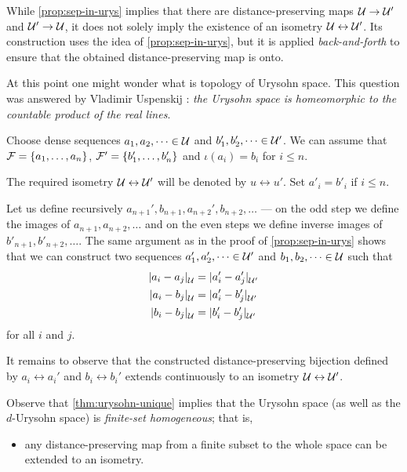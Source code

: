 While \ref{prop:sep-in-urys} implies that there are distance-preserving maps $\mathcal{U}\to \mathcal{U}'$ and $\mathcal{U}'\to \mathcal{U}$,
it does not solely imply the existence of an isometry $\mathcal{U}\leftrightarrow \mathcal{U}'$.
Its construction uses the idea of \ref{prop:sep-in-urys}, but it is applied {}\emph{back-and-forth} to ensure that the obtained distance-preserving map is onto.

At this point one might wonder what is topology of Urysohn space.
This question was answered by Vladimir Uspenskij \cite{uspenskij}: \textit{the Urysohn space is homeomorphic to the countable product of the real lines}.

Choose dense sequences $a_1,a_2,\dots\in \mathcal{U}$ and $b'_1,b'_2,\dots\in \mathcal{U}'$.
We can assume that $\mathcal{F}=\{a_1,\dots,a_n\}$, $\mathcal{F}'=\{b_1',\dots,b_n'\}$ and $\iota(a_i)=b_i$ for $i\le n$.

The required isometry $\mathcal{U}\leftrightarrow \mathcal{U}'$ will be denoted by $u \leftrightarrow u'$.
Set $a'_i=b'_i$ if $i\le n$.

Let us define recursively $a_{n+1}',b_{n+1}, a_{n+2}', b_{n+2},\dots$ --- on the odd step we define the images of $a_{n+1},a_{n+2},\dots$ and on the even steps we define inverse images of $b'_{n+1},b'_{n+2},\dots$.
The same argument as in the proof of \ref{prop:sep-in-urys} shows that we can construct two sequences $a_1',a_2',\dots\in \mathcal{U}'$ and $b_1,b_2,\dots\in \mathcal{U}$ such that
\begin{align*}
\dist{a_i}{a_j}{\spc{U}}&=\dist{a_i'}{a_j'}{\spc{U}'}
\\
\dist{a_i}{b_j}{\spc{U}}&=\dist{a_i'}{b_j'}{\spc{U}'}
\\
\dist{b_i}{b_j}{\spc{U}}&=\dist{b_i'}{b_j'}{\spc{U}'}
\end{align*}
for all $i$ and $j$.

It remains to observe that the constructed distance-preserving bijection defined by $a_i\leftrightarrow a_i'$ and $b_i\leftrightarrow b_i'$ extends
continuously to an isometry $\mathcal{U}\leftrightarrow \mathcal{U}'$. 
\qeds

Observe that \ref{thm:urysohn-unique} implies that the Urysohn space (as well as the $d$-Urysohn space) is \emph{finite-set homogeneous}; that is,
\begin{itemize}
 \item any distance-preserving map from a finite subset to the whole space can be extended to an isometry.
\end{itemize}

